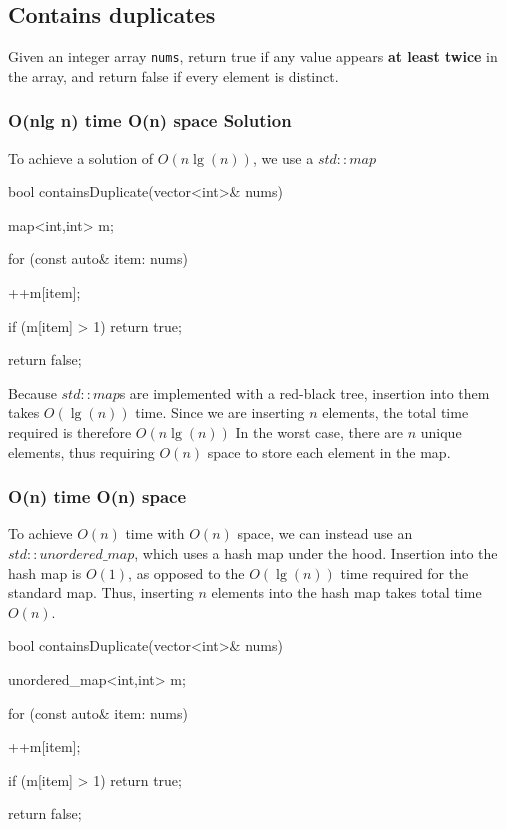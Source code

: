 \documentclass{report}
\begin{document}
    \pagebreak 
    \bigbreak \noindent 
    \subsection{Contains duplicates}
    \bigbreak \noindent 
    Given an integer array \texttt{nums}, return true if any value appears \textbf{at least twice} in the array, and return false if every element is distinct.
    \bigbreak \noindent 
    \subsubsection{O(nlg n) time O(n) space Solution}
    \bigbreak \noindent 
    To achieve a solution of $O(n \lg(n)) $, we use a $std::map$
    \bigbreak \noindent 
    \begin{cppcode}
        bool containsDuplicate(vector<int>& nums) {
            map<int,int> m;

            for (const auto& item: nums) {
                ++m[item];

                if (m[item] > 1) return true;
            }
            return false;
        }
    \end{cppcode}
    \bigbreak \noindent 
    Because $std::map$s are implemented with a red-black tree, insertion into them takes $O(\lg(n)) $ time. Since we are inserting $n$ elements, the total time required is therefore $O(n\lg(n)) $
    \bigbreak \noindent 
    In the worst case, there are $n$ unique elements, thus requiring $O(n)$ space to store each element in the map.

    \bigbreak \noindent 
    \subsubsection{O(n) time O(n) space}
    \bigbreak \noindent 
    To achieve $O(n)$ time with $O(n)$ space, we can instead use an $std::unordered\_map$, which uses a hash map under the hood. Insertion into the hash map is $O(1)$, as opposed to the $O(\lg(n))$ time required  for the standard map. Thus, inserting $n$ elements into the hash map takes total time $O(n)$.
    \bigbreak \noindent 
    \begin{cppcode}
         bool containsDuplicate(vector<int>& nums) {
            unordered_map<int,int> m;

            for (const auto& item: nums) {
                ++m[item];

                if (m[item] > 1) return true;
            }
            return false;
        }
    \end{cppcode}
\end{document}
